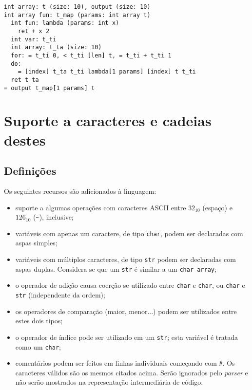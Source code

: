 \documentclass{article}
\newenvironment{smallitem}{
    \vspace{-1mm}
    \begin{itemize}
    \setlength{\parskip}{0pt}
    \setlength{\itemsep}{2pt}
}{
    \vspace{-2mm}
    \end{itemize}
}
\begin{document}
\begin{verbatim}
int array: t (size: 10), output (size: 10)
int array fun: t_map (params: int array t)
  int fun: lambda (params: int x)
    ret + x 2
  int var: t_ti
  int array: t_ta (size: 10)
  for: = t_ti 0, < t_ti [len] t, = t_ti + t_ti 1
  do:
    = [index] t_ta t_ti lambda[1 params] [index] t t_ti
  ret t_ta
= output t_map[1 params] t

\end{verbatim}

\section{Suporte a caracteres e cadeias destes}

\subsection{Definições}

Os seguintes recursos são adicionados à linguagem:

\begin{smallitem}
    \item suporte a algumas operações com caracteres ASCII entre $32_{10}$
        (espaço) e $126_{10}$ (\texttt{\~}), inclusive;
    \item variáveis com apenas um caractere, de tipo \texttt{char}, podem ser
        declaradas com aspas simples;
    \item variáveis com múltiplos caracteres, de tipo \texttt{str} podem ser
        declaradas com aspas duplas. Considera-se que um \texttt{str} é
        similar a um \texttt{char array};
    \item o operador de adição causa coerção se utilizado entre \texttt{char} e
        \texttt{char}, ou \texttt{char} e \texttt{str} (independente da ordem);
    \item os operadores de comparação (maior, menor...) podem ser utilizados
        entre estes dois tipos;
    \item o operador de índice pode ser utilizado em um \texttt{str}; esta
        variável é tratada como um \texttt{char};
    \item comentários podem ser feitos em linhas individuais começando com
        \texttt{\#}. Os caracteres válidos são os mesmos citados acima.
        Serão ignorados pelo \emph{parser} e não serão mostrados na
        representação intermediária de código.
\end{smallitem}
\end{document}
